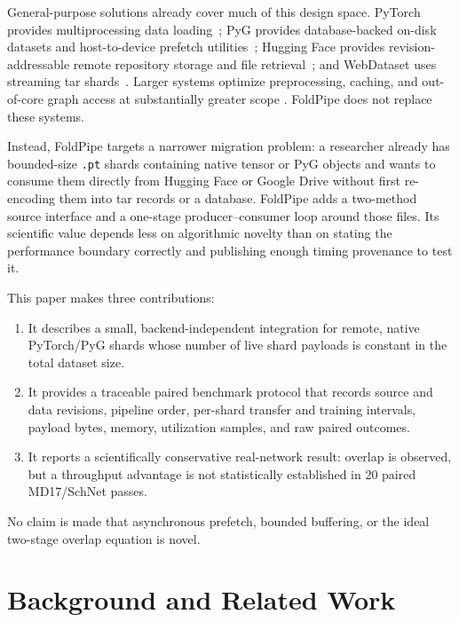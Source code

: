 \documentclass[10pt]{article}
\begin{document}
General-purpose solutions already cover much of this design space.  PyTorch
provides multiprocessing data loading~\cite{paszke2019pytorch}; PyG provides
database-backed on-disk datasets and host-to-device prefetch
utilities~\cite{pygondiskdocs,pygloaderdocs}; Hugging Face provides
revision-addressable remote repository storage and file
retrieval~\cite{huggingfacehub}; and WebDataset uses streaming tar
shards~\cite{aizman2020webdataset}.  Larger systems optimize preprocessing,
caching, and out-of-core graph access at substantially greater scope
\cite{murray2021tfdata,mohan2021stalls,graur2022cachew,waleffe2023mariusgnn}.
FoldPipe does not replace these systems.

Instead, FoldPipe targets a narrower migration problem: a researcher already
has bounded-size \texttt{.pt} shards containing native tensor or PyG objects and
wants to consume them directly from Hugging Face or Google Drive without first
re-encoding them into tar records or a database.  FoldPipe adds a two-method
source interface and a one-stage producer--consumer loop around those files.
Its scientific value depends less on algorithmic novelty than on stating the
performance boundary correctly and publishing enough timing provenance to test
it.

This paper makes three contributions:

\begin{enumerate}
  \item It describes a small, backend-independent integration for remote,
  native PyTorch/PyG shards whose number of live shard payloads is constant in
  the total dataset size.
  \item It provides a traceable paired benchmark protocol that records source
  and data revisions, pipeline order, per-shard transfer and training
  intervals, payload bytes, memory, utilization samples, and raw paired
  outcomes.
  \item It reports a scientifically conservative real-network result: overlap
  is observed, but a throughput advantage is not statistically established in
  20 paired MD17/SchNet passes.
\end{enumerate}

No claim is made that asynchronous prefetch, bounded buffering, or the ideal
two-stage overlap equation is novel.

\section{Background and Related Work}
\end{document}
